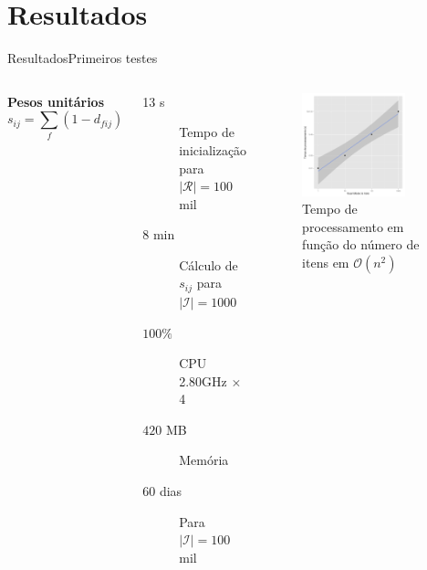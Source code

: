 \section[Resultados]{Resultados}

\begin{frame}{Resultados}{Primeiros testes}
\begin{columns}[c]
\textbf{Pesos unitários}
$$
    s_{ij} = \sum_{f}{\left(1-d_{fij}\right)}
$$
\begin{description}
	\item[13 s] Tempo de inicialização para $\left|\mathcal{R}\right| = 100$ mil
	\item[8 min] Cálculo de $s_{ij}$ para $\left|\mathcal{I}\right| = 1000$
	\item[$100 \%$] CPU \\ 2.80GHz $\times$ 4
	\item[$420$ MB] Memória 
	\item[]
	\item[60 dias] Para $\left|\mathcal{I}\right| = 100$  mil
\end{description}	
\begin{figure}[ht]
    \begin{center}
    \includegraphics[width=0.8\textwidth]{img/ixt}
    \end{center}
\caption{Tempo de processamento em função do número de itens em $\mathcal{O}\left(n^2\right)$}
\end{figure}
\end{columns}
\end{frame}


